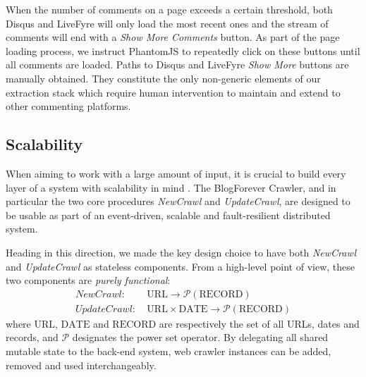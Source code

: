 When the number of comments on a page exceeds a certain threshold, both Disqus and LiveFyre will only load the most recent ones and the stream of comments will end with a \emph{Show More Comments} button. As part of the page loading process, we instruct PhantomJS to repeatedly click on these buttons until all comments are loaded. Paths to Disqus and LiveFyre \emph{Show More} buttons are manually obtained. They constitute the only non-generic elements of our extraction stack which require human intervention to maintain and extend to other commenting platforms.

\subsection{Scalability}
When aiming to work with a large amount of input, it is crucial to build every layer of a system with scalability in mind \cite{thereactivemanifesto2013}. The BlogForever Crawler, and in particular the two core procedures \emph{NewCrawl} and \emph{UpdateCrawl}, are designed to be usable as part of an event-driven, scalable and fault-resilient distributed system.

Heading in this direction, we made the key design choice to have both \emph{NewCrawl} and \emph{UpdateCrawl} as stateless components. From a high-level point of view, these two components are \emph{purely functional}:
%
\newcommand\URL{\text{URL}}
\newcommand\DATE{\text{DATE}}
\newcommand\RECORD{\text{RECORD}}
\begin{equation*}
  \begin{split}
    NewCrawl:    &~ \URL \rightarrow \mathcal{P}(\RECORD)\\
    UpdateCrawl: &~ \URL \times \DATE \rightarrow \mathcal{P}(\RECORD)
  \end{split}
\end{equation*}
%
where $\URL$, $\DATE$ and $\RECORD$ are respectively the set of all URLs, dates and records, and $\mathcal{P}$ designates the power set operator. By delegating all shared mutable state to the back-end system, web crawler instances can be added, removed and used interchangeably.
